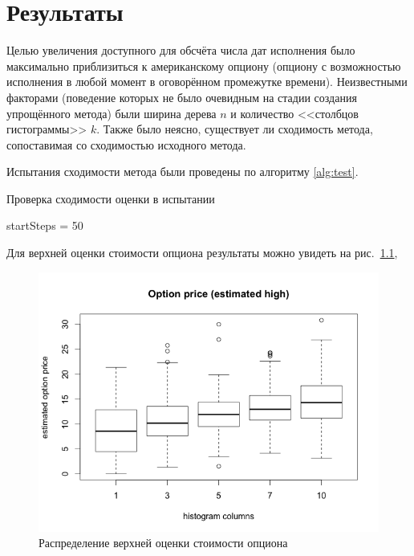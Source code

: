 \documentclass[specialist,
               substylefile = spbu.rtx,
               subf,href,colorlinks=true, 12pt]{disser}
\begin{document}
\chapter{Результаты}
	Целью увеличения доступного для обсчёта числа дат исполнения было максимально приблизиться к американскому опциону (опциону с возможностью исполнения в любой момент в оговорённом промежутке времени). Неизвестными факторами (поведение которых не было очевидным на стадии создания упрощённого метода) были ширина дерева $n$ и количество <<столбцов гистограммы>> $k$. Также было неясно, существует ли сходимость метода, сопоставимая со сходимостью исходного метода.
	\par Испытания сходимости метода были проведены по алгоритму \ref{alg:test}.
	\begin{algorithm}
	\renewcommand{\AlCapSty}{\text}
		\caption{Проверка сходимости оценки в испытании}
		\label{alg:test}
			\DontPrintSemicolon
			startSteps = 50\;
	\end{algorithm}
	\par Для верхней оценки стоимости опциона результаты можно увидеть на рис.~\ref{fig:upperEstimate},
	\begin{figure}[h]
		\includegraphics[width=\textwidth]{upper_estimate}
		\caption{Распределение верхней оценки стоимости опциона}
		\label{fig:upperEstimate}
	\end{figure}
\end{document}
